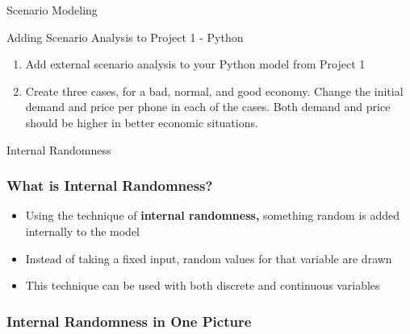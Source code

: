 \documentclass[handout, 11pt]{beamer}
\begin{document}
\begin{section}{Scenario Modeling}
\begin{frame}
{\begin{block}{Adding Scenario Analysis to Project 1 - Python}
\begin{enumerate}
\item Add external scenario analysis to your Python model from Project 1
\item Create three cases, for a bad, normal, and good economy. Change the initial demand and price per phone in each of the cases. Both demand and price should be higher in better economic situations. 
\end{enumerate}
\vfill
\end{block}
}
\label{labs:scenario-analysis-python-lab-1}
\end{frame}
\end{section}
\begin{section}{Internal Randomness}
\begin{frame}
\frametitle{What is Internal Randomness?}
\begin{itemize}
\item Using the technique of
\textbf{internal randomness,}
something random is added internally to the model
\vfill
\item Instead of taking a fixed input, random values for that variable are drawn
\vfill
\item This technique can be used with both discrete and continuous variables
\end{itemize}
\end{frame}
\begin{frame}
\frametitle{Internal Randomness in One Picture}
\begin{center}
\begin{adjustbox}{width=0.9\textwidth, height=0.8\textheight, keepaspectratio}
\end{adjustbox}
\end{center}
\end{frame}
\end{section}
\end{document}

